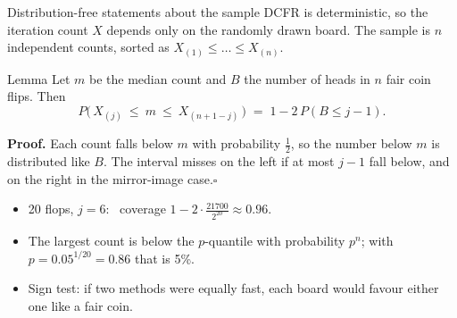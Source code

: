 \documentclass[10pt,aspectratio=169]{beamer}
\begin{document}
\begin{frame}{Distribution-free statements about the sample}
DCFR is deterministic, so the iteration count $X$ depends only on the randomly drawn board. The sample is $n$ independent
counts, sorted as $X_{(1)}\le\dots\le X_{(n)}$.
\pause
\begin{block}{Lemma}
Let $m$ be the median count and $B$ the number of heads in $n$ fair coin flips. Then
\[ P\big(\,X_{(j)}\ \le\ m\ \le\ X_{(n+1-j)}\,\big) \;=\; 1-2\,P(B\le j-1). \]
\end{block}
\pause
\textbf{Proof.} Each count falls below $m$ with probability $\tfrac12$, so the number below $m$ is distributed like $B$. The
interval misses on the left if at most $j-1$ fall below, and on the right in the mirror-image case.\hfill$\square$

\pause
\medskip
\small
\begin{itemize}\setlength\itemsep{1pt}
\item 20 flops, $j=6$: \ coverage $1-2\cdot\tfrac{21700}{2^{20}}\approx0.96$.
\item The largest count is below the $p$-quantile with probability $p^n$; with $p=0.05^{1/20}=0.86$ that is 5\%.
\item Sign test: if two methods were equally fast, each board would favour either one like a fair coin.
\end{itemize}
\end{frame}
\end{document}

